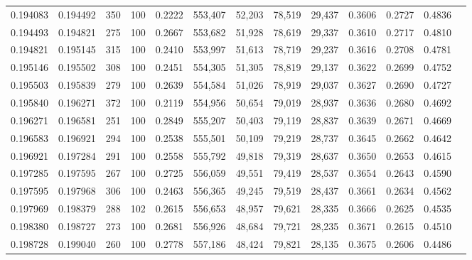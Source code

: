 \begin{tabular}{rrrrrrrrrrrrr}
0.194083 & 0.194492 &   350 & 100 &                                     0.2222 & 553,407 &  52,203 &  78,519 &  29,437 & 0.3606 & 0.2727 & 0.4836 \\
0.194493 & 0.194821 &   275 & 100 &                                     0.2667 & 553,682 &  51,928 &  78,619 &  29,337 & 0.3610 & 0.2717 & 0.4810 \\
0.194821 & 0.195145 &   315 & 100 &                                     0.2410 & 553,997 &  51,613 &  78,719 &  29,237 & 0.3616 & 0.2708 & 0.4781 \\
0.195146 & 0.195502 &   308 & 100 &                                     0.2451 & 554,305 &  51,305 &  78,819 &  29,137 & 0.3622 & 0.2699 & 0.4752 \\
0.195503 & 0.195839 &   279 & 100 &                                     0.2639 & 554,584 &  51,026 &  78,919 &  29,037 & 0.3627 & 0.2690 & 0.4727 \\
0.195840 & 0.196271 &   372 & 100 &                                     0.2119 & 554,956 &  50,654 &  79,019 &  28,937 & 0.3636 & 0.2680 & 0.4692 \\
0.196271 & 0.196581 &   251 & 100 &                                     0.2849 & 555,207 &  50,403 &  79,119 &  28,837 & 0.3639 & 0.2671 & 0.4669 \\
0.196583 & 0.196921 &   294 & 100 &                                     0.2538 & 555,501 &  50,109 &  79,219 &  28,737 & 0.3645 & 0.2662 & 0.4642 \\
0.196921 & 0.197284 &   291 & 100 &                                     0.2558 & 555,792 &  49,818 &  79,319 &  28,637 & 0.3650 & 0.2653 & 0.4615 \\
0.197285 & 0.197595 &   267 & 100 &                                     0.2725 & 556,059 &  49,551 &  79,419 &  28,537 & 0.3654 & 0.2643 & 0.4590 \\
0.197595 & 0.197968 &   306 & 100 &                                     0.2463 & 556,365 &  49,245 &  79,519 &  28,437 & 0.3661 & 0.2634 & 0.4562 \\
0.197969 & 0.198379 &   288 & 102 &                                     0.2615 & 556,653 &  48,957 &  79,621 &  28,335 & 0.3666 & 0.2625 & 0.4535 \\
0.198380 & 0.198727 &   273 & 100 &                                     0.2681 & 556,926 &  48,684 &  79,721 &  28,235 & 0.3671 & 0.2615 & 0.4510 \\
0.198728 & 0.199040 &   260 & 100 &                                     0.2778 & 557,186 &  48,424 &  79,821 &  28,135 & 0.3675 & 0.2606 & 0.4486 \\

\end{tabular}
